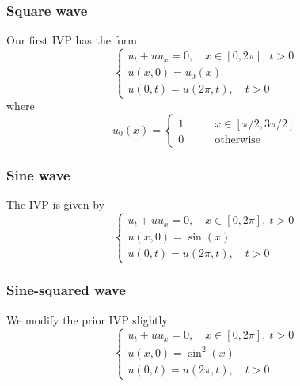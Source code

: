 \documentclass{myproject}
\begin{document}
\subsubsection{Square wave}

Our first IVP has the form
\begin{equation}
    \begin{cases}
        u_t + uu_x = 0, \quad x \in [0, 2\pi], \: t>0 \\
        u(x,0) = u_0(x) \\
        u(0,t) = u(2\pi,t), \quad t > 0
    \end{cases}
\end{equation}
where
\begin{equation}
    u_0(x) = 
    \begin{cases}
        1 \qquad &  x \in [\pi/2, 3\pi/2] \\
        0 \qquad & \text{otherwise} 
    \end{cases}
\end{equation}

\subsubsection{Sine wave}

The IVP is given by
\begin{equation}
    \begin{cases}
        u_t + uu_x = 0, \quad x \in [0, 2\pi], \: t>0 \\
        u(x,0) = \sin(x) \\
        u(0,t) = u(2\pi,t), \quad t > 0
    \end{cases}
\end{equation}

\subsubsection{Sine-squared wave}

We modify the prior IVP slightly
\begin{equation}
    \begin{cases}
        u_t + uu_x = 0, \quad x \in [0, 2\pi], \: t>0 \\
        u(x,0) = \sin^2(x) \\
        u(0,t) = u(2\pi,t), \quad t > 0
    \end{cases}
\end{equation}
\end{document}
